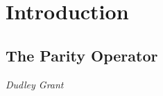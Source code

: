 \section{Introduction}


\subsection{The Parity Operator}
\vspace{-1.0em}
\begin{center}
\tiny{\textit{Dudley Grant}}
\end{center}


